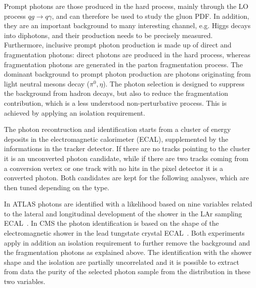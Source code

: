 \documentclass{PoS}
\begin{document}
Prompt photons are those produced in the hard process, mainly through the LO process $qg \to q\gamma$, and can therefore
be used to study the gluon PDF. In addition, they are an important background to many interesting channel, e.g. Higgs
decays into diphotons, and their production needs to be precisely measured.  
Furthermore, inclusive prompt photon production is made up of direct and fragmentation photons: direct photons
are produced in the hard process, whereas fragmentation photons are generated in the parton fragmentation process. 
The dominant background to prompt photon production are photons originating from light neutral mesons decay ($\pi^0,
\eta$). 
The photon selection is designed to suppress the background from hadron decays, but also to reduce the fragmentation
contribution, which is a less understood non-perturbative process. This is achieved by applying an isolation requirement. 

The photon recontruction and identification starts from a cluster of energy deposits in the electromagnetic calorimeter
(ECAL), supplemented by the informations in the tracker detector. If there are no tracks pointing to the cluster it is an
unconverted photon candidate, while if there are two tracks coming from a conversion vertex or one track with no hits in
the pixel detector it is a converted photon. Both candidates are kept for the following analyses, which are then tuned
depending on the type. 

In ATLAS photons are identified with a likelihood based on nine variables related to the lateral and longitudinal
development of the shower in the LAr sampling ECAL~\cite{ATLAS:2012ana}. In CMS the photon identification is
based on the shape of the electromagnetic shower in the lead tungstate crystal ECAL~\cite{Chatrchyan:2013dga}.
Both experiments apply in addition an isolation requirement to further remove the background and the fragmentation
photons as explained above. The identification with the shower shape and the isolation are partially uncorrelated and
it is possible to extract from data the purity of the selected photon sample from the distribution in these two variables. 
\end{document}
